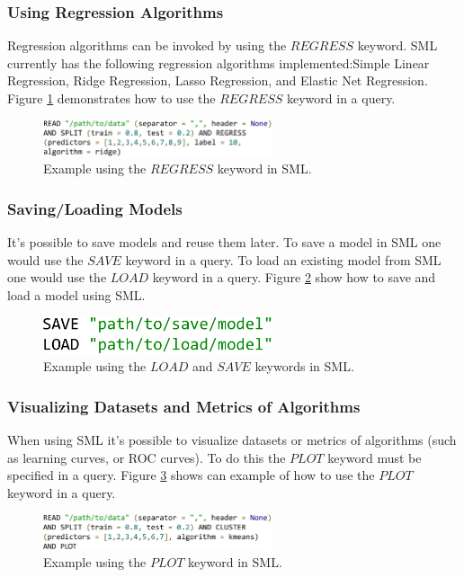 \documentclass[jair,twoside,11pt,theapa]{article}
\begin{document}
\subsubsection{Using Regression Algorithms}
Regression algorithms can be invoked by using the \(REGRESS\) keyword. SML currently has the following regression algorithms implemented:Simple Linear Regression, Ridge Regression, Lasso Regression, and Elastic Net Regression. Figure \ref{fig:SML:REGRESS} demonstrates how to use the \(REGRESS\) keyword in a query.

\begin{figure}
\includegraphics[width=0.6\textwidth]{figs/REGRESS.png}
\centering
\caption{Example using the \(REGRESS\) keyword in SML.}
\label{fig:SML:REGRESS}
\end{figure}

\subsubsection{Saving/Loading Models}
It's possible to save models and reuse them later. To save a model in SML one would use the \(SAVE\) keyword in a query. To load an existing model from SML one would use the \(LOAD\) keyword in a query. Figure \ref{fig:SML:SAVE_LOAD} show how to save and load a model using SML.

\begin{figure}
\includegraphics[width=0.6\textwidth]{figs/SAVE_LOAD.png}
\centering
\caption{Example using the \(LOAD\) and \(SAVE\) keywords in SML.}
\label{fig:SML:SAVE_LOAD}
\end{figure}

\subsubsection{Visualizing Datasets and Metrics of Algorithms}
When using SML it's possible to visualize datasets or metrics of algorithms (such as learning curves, or ROC curves). To do this the \(PLOT\) keyword must be specified in a query. Figure \ref{fig:SML:PLOT} shows can example of how to use the \(PLOT\) keyword in a query.

\begin{figure}
\includegraphics[width=0.6\textwidth]{figs/PLOT.png}
\centering
\caption{Example using the \(PLOT\) keyword in SML.}
\label{fig:SML:PLOT}
\end{figure}
\end{document}
